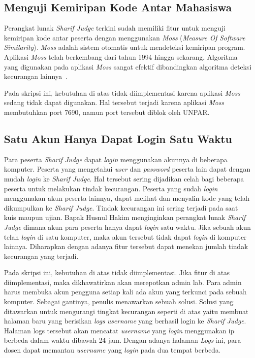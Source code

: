 \subsection{Menguji Kemiripan Kode Antar Mahasiswa}
Perangkat lunak \textit{Sharif Judge} terkini sudah memiliki fitur untuk menguji kemiripan kode antar peserta dengan menggunakan \textit{Moss} (\textit{Measure Of Software Similarity}). \textit{Moss} adalah sistem otomatis untuk mendeteksi kemiripan program. Aplikasi \textit{Moss} telah berkembang dari tahun 1994 hingga sekarang. Algoritma yang digunakan pada aplikasi \textit{Moss} sangat efektif dibandingkan algoritma deteksi kecurangan lainnya~\cite{aiken:10:moss}. 

Pada skripsi ini, kebutuhan di atas tidak diimplementasi karena aplikasi \textit{Moss} sedang tidak dapat digunakan. Hal tersebut terjadi karena aplikasi \textit{Moss} membutuhkan port 7690, namun port tersebut diblok oleh UNPAR.

\subsection{Satu Akun Hanya Dapat Login Satu Waktu}
Para peserta \textit{Sharif Judge} dapat \textit{login} menggunakan akunnya di beberapa komputer. Peserta yang mengetahui \textit{user} dan \textit{password} peserta lain dapat dengan mudah \textit{login} ke \textit{Sharif Judge}. Hal tersebut sering dijadikan celah bagi beberapa peserta untuk melakukan tindak kecurangan. Peserta yang sudah \textit{login} menggunakan akun peserta lainnya, dapat melihat dan menyalin kode yang telah dikumpulkan ke \textit{Sharif Judge}. Tindak kecurangan ini sering terjadi pada saat kuis maupun ujian. Bapak Husnul Hakim menginginkan perangkat lunak \textit{Sharif Judge} dimana akun para peserta hanya dapat \textit{login} satu waktu. Jika sebuah akun telah \textit{login} di satu komputer, maka akun tersebut tidak dapat \textit{login} di komputer lainnya. Diharapkan dengan adanya fitur tersebut dapat menekan jumlah tindak kecurangan yang terjadi. 

Pada skripsi ini, kebutuhan di atas tidak diimplementasi. Jika fitur di atas diimplementasi, maka dikhawatirkan akan merepotkan admin lab. Para admin harus membuka akun pengguna setiap kali ada akun yang terkunci pada sebuah komputer. Sebagai gantinya, penulis menawarkan sebuah solusi. Solusi yang ditawarkan untuk mengurangi tingkat kecurangan seperti di atas yaitu membuat halaman baru yang berisikan \textit{logs} \textit{username} yang berhasil login ke \textit{Sharif Judge}. Halaman logs tersebut akan mencatat \textit{username} yang \textit{login} menggunakan ip berbeda dalam waktu dibawah 24 jam. Dengan adanya halaman \textit{Logs} ini, para dosen dapat memantau \textit{username} yang \textit{login} pada dua tempat berbeda.	

